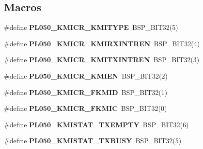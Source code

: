 \subsection*{Macros}
\begin{DoxyCompactItemize}
\item 
\mbox{\label{arm-pl050-regs_8h_aa78d8cf6eec51c0e5b7ed2fd9674b25d}} 
\#define {\bfseries P\+L050\+\_\+\+K\+M\+I\+C\+R\+\_\+\+K\+M\+I\+T\+Y\+PE}~B\+S\+P\+\_\+\+B\+I\+T32(5)
\item 
\mbox{\label{arm-pl050-regs_8h_a818e060f4b015dca7339578dd3e1de86}} 
\#define {\bfseries P\+L050\+\_\+\+K\+M\+I\+C\+R\+\_\+\+K\+M\+I\+R\+X\+I\+N\+T\+R\+EN}~B\+S\+P\+\_\+\+B\+I\+T32(4)
\item 
\mbox{\label{arm-pl050-regs_8h_ae7ea16ca240c303c9c65a5db529b894b}} 
\#define {\bfseries P\+L050\+\_\+\+K\+M\+I\+C\+R\+\_\+\+K\+M\+I\+T\+X\+I\+N\+T\+R\+EN}~B\+S\+P\+\_\+\+B\+I\+T32(3)
\item 
\mbox{\label{arm-pl050-regs_8h_ac7697f50ebd5c30ca07c56888c1edfdf}} 
\#define {\bfseries P\+L050\+\_\+\+K\+M\+I\+C\+R\+\_\+\+K\+M\+I\+EN}~B\+S\+P\+\_\+\+B\+I\+T32(2)
\item 
\mbox{\label{arm-pl050-regs_8h_aec07860d2bb4968a572ac476e4d941e8}} 
\#define {\bfseries P\+L050\+\_\+\+K\+M\+I\+C\+R\+\_\+\+F\+K\+M\+ID}~B\+S\+P\+\_\+\+B\+I\+T32(1)
\item 
\mbox{\label{arm-pl050-regs_8h_a6e527aef78a23cf10d8b1747a16de78b}} 
\#define {\bfseries P\+L050\+\_\+\+K\+M\+I\+C\+R\+\_\+\+F\+K\+M\+IC}~B\+S\+P\+\_\+\+B\+I\+T32(0)
\item 
\mbox{\label{arm-pl050-regs_8h_aebf42a088a689b776c884859bf077fbd}} 
\#define {\bfseries P\+L050\+\_\+\+K\+M\+I\+S\+T\+A\+T\+\_\+\+T\+X\+E\+M\+P\+TY}~B\+S\+P\+\_\+\+B\+I\+T32(6)
\item 
\mbox{\label{arm-pl050-regs_8h_a59b5c0ed713465f566286be3a0f9d37a}} 
\#define {\bfseries P\+L050\+\_\+\+K\+M\+I\+S\+T\+A\+T\+\_\+\+T\+X\+B\+U\+SY}~B\+S\+P\+\_\+\+B\+I\+T32(5)
\item 
\mbox{\label{arm-pl050-regs_8h_a51b283eaa844ce22dbeaf62ec837dbda}} 

\end{DoxyCompactItemize}
